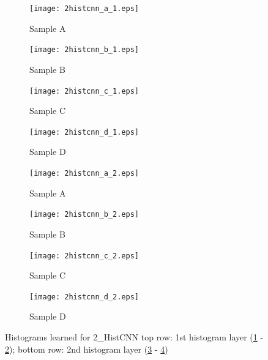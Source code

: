 \documentclass[10pt,twocolumn,letterpaper]{article}
\begin{document}
\begin{figure}[htb]
	\centering	
	\begin{subfigure}[b]{.20\textwidth}  %
		\centering
		\texttt{[image: 2histcnn\_a\_1.eps]}
		\caption{Sample A}
		\label{subfig:2histcnn_1a}
	\end{subfigure}
	\hfill
	\begin{subfigure}[b]{.20\textwidth}
		\centering
		\texttt{[image: 2histcnn\_b\_1.eps]}
		\caption{Sample B}
	\end{subfigure}
	\hfill
	\begin{subfigure}[b]{.20\textwidth}
		\centering
		\texttt{[image: 2histcnn\_c\_1.eps]}
		\caption{Sample C}
	\end{subfigure}
	\hfill
	\begin{subfigure}[b]{.20\textwidth}
		\centering
		\texttt{[image: 2histcnn\_d\_1.eps]}
		\caption{Sample D}
		\label{subfig:2histcnn_1d}
	\end{subfigure}
	
	\begin{subfigure}[b]{.20\textwidth}  %
		\centering
		\texttt{[image: 2histcnn\_a\_2.eps]}
		\caption{Sample A}
		\label{subfig:2histcnn_2a}
	\end{subfigure}
	\hfill
	\begin{subfigure}[b]{.20\textwidth}
		\centering
		\texttt{[image: 2histcnn\_b\_2.eps]}
		\caption{Sample B}
	\end{subfigure}
	\hfill
	\begin{subfigure}[b]{.20\textwidth}
		\centering
		\texttt{[image: 2histcnn\_c\_2.eps]}
		\caption{Sample C}
	\end{subfigure}
	\hfill
	\begin{subfigure}[b]{.20\textwidth}
		\centering
		\texttt{[image: 2histcnn\_d\_2.eps]}
		\caption{Sample D}
		\label{subfig:2histcnn_2d}
	\end{subfigure}
	\caption{Histograms learned for 2\_HistCNN top row: 1st histogram layer (\ref{subfig:2histcnn_1a} - \ref{subfig:2histcnn_1d}); bottom row: 2nd histogram layer (\ref{subfig:2histcnn_2a} - \ref{subfig:2histcnn_2d})}
	\label{fig:histogram_2histcnn}
\end{figure}
\end{document}
